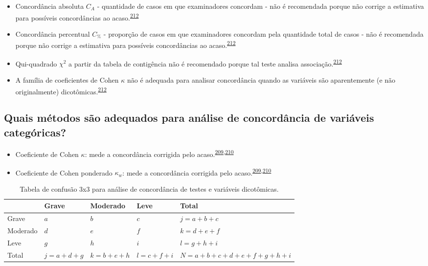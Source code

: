 \documentclass[
  a4paper,
]{book}
\begin{document}
\begin{itemize}
\item
  Concordância absoluta \(C_{A}\) - quantidade de casos em que examinadores concordam - não é recomendada porque não corrige a estimativa para possíveis concordâncias ao acaso.\textsuperscript{\protect\hyperlink{ref-banerjee1999}{212}}
\item
  Concordância percentual \(C_{\%}\) - proporção de casos em que examinadores concordam pela quantidade total de casos - não é recomendada porque não corrige a estimativa para possíveis concordâncias ao acaso.\textsuperscript{\protect\hyperlink{ref-banerjee1999}{212}}
\item
  Qui-quadrado \(\chi^2\) a partir da tabela de contigência não é recomendado porque tal teste analisa associação.\textsuperscript{\protect\hyperlink{ref-banerjee1999}{212}}
\item
  A família de coeficientes de Cohen \(\kappa\) não é adequada para analisar concordância quando as variáveis são aparentemente (e não originalmente) dicotômicas.\textsuperscript{\protect\hyperlink{ref-banerjee1999}{212}}
\end{itemize}

\hypertarget{quais-muxe9todos-suxe3o-adequados-para-anuxe1lise-de-concorduxe2ncia-de-variuxe1veis-categuxf3ricas}{%
\subsection{Quais métodos são adequados para análise de concordância de variáveis categóricas?}\label{quais-muxe9todos-suxe3o-adequados-para-anuxe1lise-de-concorduxe2ncia-de-variuxe1veis-categuxf3ricas}}

\begin{itemize}
\item
  Coeficiente de Cohen \(\kappa\): mede a concordância corrigida pelo acaso.\textsuperscript{\protect\hyperlink{ref-scott1955}{209},\protect\hyperlink{ref-cohen1960}{210}}
\item
  Coeficiente de Cohen ponderado \(\kappa_{w}\): mede a concordância corrigida pelo acaso.\textsuperscript{\protect\hyperlink{ref-scott1955}{209},\protect\hyperlink{ref-cohen1960}{210}}
\end{itemize}

\begin{table}

\caption{\label{tab:crosstable-kappa-3x3}Tabela de confusão 3x3 para análise de concordância de testes e variáveis dicotômicas.}
\centering
\begin{tabu} to 
\toprule
\textbf{ } & \textbf{Grave} & \textbf{Moderado} & \textbf{Leve} & \textbf{Total}\\
\midrule
Grave & $a$ & $b$ & $c$ & $j=a+b+c$\\
Moderado & $d$ & $e$ & $f$ & $k=d+e+f$\\
Leve & $g$ & $h$ & $i$ & $l=g+h+i$\\
Total & $j=a+d+g$ & $k=b+e+h$ & $l=c+f+i$ & $N=a+b+c+d+e+f+g+h+i$\\
\bottomrule
\end{tabu}
\end{table}
\end{document}
